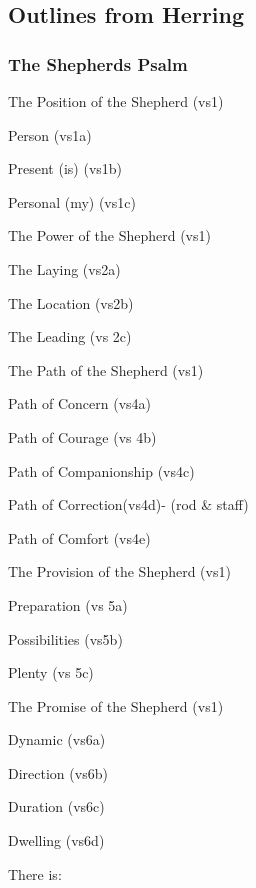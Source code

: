\subsection{Outlines from Herring}

\subsubsection{The Shepherds Psalm}


\begin{compactenum}[I.]
    \item The Position of the Shepherd (vs1)
    \begin{compactenum}[A.]
        \item Person (vs1a)
        \item Present (is) (vs1b)
        \item Personal (my) (vs1c)
    \end{compactenum}
    \item The Power of the Shepherd (vs1)
    \begin{compactenum}[A.]
        \item The Laying (vs2a)
        \item The Location (vs2b)
        \item The Leading (vs 2c) 
    \end{compactenum}
    \item The Path of the Shepherd (vs1)
    \begin{compactenum}[A.]
        \item Path of Concern (vs4a)
        \item Path of Courage (vs 4b)
        \item Path of Companionship (vs4c)
        \item Path of Correction(vs4d)- (rod \& staff)
        \item Path of Comfort (vs4e)
    \end{compactenum}
    \item The Provision of the Shepherd (vs1)
    \begin{compactenum}[A.]
        \item Preparation (vs 5a)
        \item Possibilities (vs5b)
        \item Plenty (vs 5c)
    \end{compactenum}
    \item The Promise of the Shepherd (vs1)
    \begin{compactenum}[A.]
        \item Dynamic (vs6a)
        \item Direction (vs6b)
        \item Duration (vs6c)
        \item Dwelling (vs6d)\\
    \end{compactenum}
\end{compactenum}There is:
